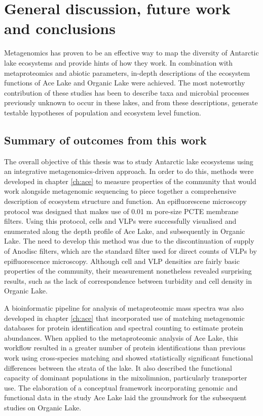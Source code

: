 \chapter{General discussion, future work and conclusions}
\label{ch:conc}
\acresetall

Metagenomics has proven to be an effective way to map the diversity of Antarctic lake ecosystems and provide hints of how they work.
In combination with metaproteomics and abiotic parameters, in-depth descriptions of the ecosystem functions of Ace Lake and Organic Lake were achieved.
The most noteworthy contribution of these studies has been to describe taxa and microbial processes previously unknown to occur in these lakes, and from these descriptions, generate testable hypotheses of population and ecosystem level function.

\section{Summary of outcomes from this work}
The overall objective of this thesis was to study Antarctic lake ecosystems using an integrative metagenomics-driven approach.
In order to do this, methods were developed in chapter \ref{ch:ace} to measure properties of the community that would work alongside metagenomic sequencing to piece together a comprehensive description of ecosystem structure and function.
An epifluorescene microscopy protocol was designed that makes use of 0.01 \textmu{}m pore-size \ac{PCTE} membrane filters.
Using this protocol, cells and \acp{VLP} were successfully visualised and enumerated along the depth profile of Ace Lake, and subsequently in Organic Lake.
The need to develop this method was due to the discontinuation of supply of Anodisc filters, which are the standard filter used for direct counts of \acp{VLP} by epifluorescence microscopy.
Although cell and \ac{VLP} densities are fairly basic properties of the community, their measurement nonetheless revealed surprising results, such as the lack of correspondence between turbidity and cell density in Organic Lake.

A bioinformatic pipeline for analysis of metaproteomic mass spectra was also developed in chapter \ref{ch:ace} that incorporated use of matching metagenomic databases for protein identification and spectral counting to estimate protein abundances.
When applied to the metaproteomic analysis of Ace Lake, this workflow resulted in a greater number of protein identifications than previous work using cross-species matching and showed statistically significant functional differences between the strata of the lake.
It also described the functional capacity of dominant populations in the mixolimnion, particularly transporter use.
The elaboration of a conceptual framework incorporating genomic and functional data in the study Ace Lake laid the groundwork for the subsequent studies on Organic Lake.

